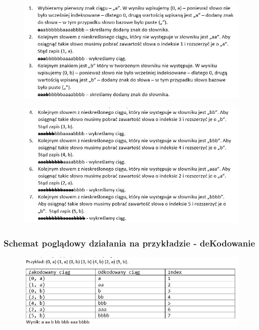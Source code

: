 \documentclass{article}
\begin{document}
\begin{figure}[h!]
\centering
\includegraphics{img/lz78_2.JPG}
\end{figure}

\newpage

\begin{figure}[h!]
\centering
\includegraphics{img/lz78_2_1.JPG}
\end{figure}

\subsubsection{Schemat poglądowy działania na przykładzie - deKodowanie}
\begin{figure}[h!]
\centering
\includegraphics{img/lz78_3.JPG}
\end{figure}

\newpage
\end{document}
